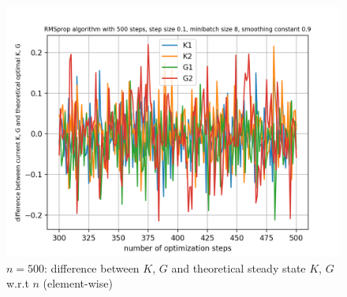 \documentclass{article}
\begin{document}
\begin{figure}[h!]
\begin{minipage}[t]{.28\paperwidth}
		\includegraphics[width=1.0\textwidth]{Figures/d_last_200_n500_sep.png}
		\caption{$n = 500$: difference between $K$, $G$ and theoretical steady state $K$, $G$ w.r.t $n$ (element-wise)}
	\end{minipage}
\end{figure}
\end{document}
